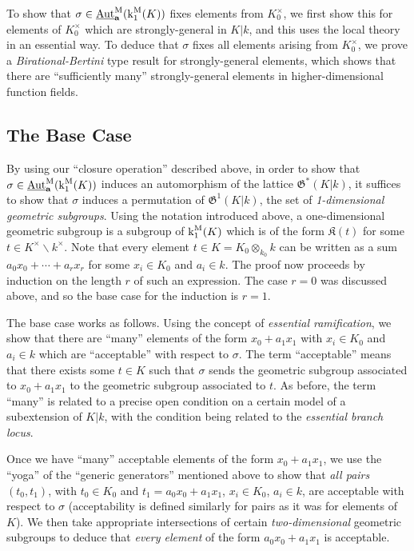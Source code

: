 \documentclass[11pt]{amsart}
\theoremstyle{definition}
\theoremstyle{remark}
\numberwithin{equation}{section}
\DeclareMathOperator{\Aut}{Aut}
\newcommand{\abf}{\mathbf{a}}
\newcommand{\Kfrak}{\mathfrak{K}}
\newcommand{\Gfrak}{\mathfrak{G}}
\newcommand{\UAutm}{\underline{\Aut}^{\rm M}}
\renewcommand{\k}{\operatorname{k}^{\rm M}}
\begin{document}
To show that $\sigma \in \UAutm_\abf(\k_1(K))$ fixes elements from $K_0^\times$, we first show this for elements of $K_0^\times$ which are strongly-general in $K|k$, and this uses the local theory in an essential way.
To deduce that $\sigma$ fixes all elements arising from $K_0^\times$, we prove a \emph{Birational-Bertini} type result for strongly-general elements, which shows that there are ``sufficiently many'' strongly-general elements in higher-dimensional function fields.

\subsection{The Base Case}

By using our ``closure operation'' described above, in order to show that $\sigma \in \UAutm_\abf(\k_1(K))$ induces an automorphism of the lattice $\Gfrak^*(K|k)$, it suffices to show that $\sigma$ induces a permutation of $\Gfrak^1(K|k)$, the set of \emph{1-dimensional geometric subgroups}.
Using the notation introduced above, a one-dimensional geometric subgroup is a subgroup of $\k_1(K)$ which is of the form $\Kfrak(t)$ for some $t \in K^\times \smallsetminus k^\times$.
Note that every element $t \in K = K_0 \otimes_{k_0} k$ can be written as a sum $a_0 x_0 + \cdots + a_r x_r$ for some $x_i \in K_0$ and $a_i \in k$.
The proof now proceeds by induction on the length $r$ of such an expression.
The case $r = 0$ was discussed above, and so the base case for the induction is $r = 1$.

The base case works as follows.
Using the concept of \emph{essential ramification}, we show that there are ``many'' elements of the form $x_0 + a_1 x_1$ with $x_i \in K_0$ and $a_i \in k$ which are ``acceptable'' with respect to $\sigma$.
The term ``acceptable'' means that there exists some $t \in K$ such that $\sigma$ sends the geometric subgroup associated to $x_0 + a_1 x_1$ to the geometric subgroup associated to $t$.
As before, the term ``many'' is related to a precise open condition on a certain model of a subextension of $K|k$, with the condition being related to the \emph{essential branch locus}.

Once we have ``many'' acceptable elements of the form $x_0 + a_1 x_1$, we use the ``yoga'' of the ``generic generators'' mentioned above to show that \emph{all pairs} $(t_0,t_1)$, with $t_0 \in K_0$ and $t_1 = a_0 x_0 + a_1 x_1$, $x_i \in K_0$, $a_i \in k$, are acceptable with respect to $\sigma$ (acceptability is defined similarly for pairs as it was for elements of $K$).
We then take appropriate intersections of certain \emph{two-dimensional} geometric subgroups to deduce that \emph{every element} of the form $a_0 x_0 + a_1 x_1$ is acceptable.
\end{document}
